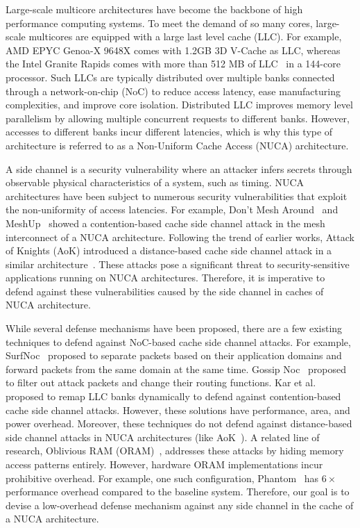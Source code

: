 Large-scale multicore architectures have become the backbone of high performance computing systems.
To meet the demand of so many cores, large-scale multicores are equipped with a large last level cache (LLC).
For example, AMD EPYC Genoa-X 9648X comes with 1.2GB 3D V-Cache as LLC, whereas the Intel Granite Rapids comes with more than 512 MB of LLC~\cite{intel-hotchips-23} in a 144-core processor.
Such LLCs are typically distributed over multiple banks connected through a network-on-chip (NoC) to reduce access latency, ease manufacturing complexities, and improve core isolation.
Distributed LLC improves memory level parallelism by allowing multiple concurrent requests to different banks.
However, accesses to different banks incur different latencies, which is why this type of architecture is referred to as a Non-Uniform Cache Access (NUCA) architecture.

A side channel is a security vulnerability where an attacker infers secrets through observable physical characteristics of a system, such as timing.
NUCA architectures have been subject to numerous security vulnerabilities that exploit the non-uniformity of access latencies.
For example, Don't Mesh Around~\cite{dont-mess-around} and MeshUp~\cite{meshup} showed a contention-based cache side channel attack in the mesh interconnect of a NUCA architecture.
Following the trend of earlier works, Attack of Knights (AoK) introduced a distance-based cache side channel attack in a similar architecture~\cite{mahmud2022distancebased}.
These attacks pose a significant threat to security-sensitive applications running on NUCA architectures.
Therefore, it is imperative to defend against these vulnerabilities caused by the side channel in caches of NUCA architecture.

\IEEEpubidadjcol

While several defense mechanisms have been proposed, there are a few existing techniques to defend against NoC-based cache side channel attacks.
For example, SurfNoc~\cite{wassel2013surfnoc} proposed to separate packets based on their application domains and forward packets from the same domain at the same time.
Gossip Noc~\cite{reinbrecht2016gossip} proposed to filter out attack packets and change their routing functions.
Kar et al.~\cite{remapping-llc} proposed to remap LLC banks dynamically to defend against contention-based cache side channel attacks.
However, these solutions have performance, area, and power overhead.
Moreover, these techniques do not defend against distance-based side channel attacks in NUCA architectures (like AoK~\cite{mahmud2022distancebased}).
A related line of research, Oblivious RAM (ORAM)~\cite{oram,phantom,sanctum}, addresses these attacks by hiding memory access patterns entirely.
However, hardware ORAM implementations incur prohibitive overhead.
For example, one such configuration, Phantom~\cite{phantom} has $6\times$ performance overhead compared to the baseline system.
Therefore, our goal is to devise a low-overhead defense mechanism against any side channel in the cache of a NUCA architecture.

